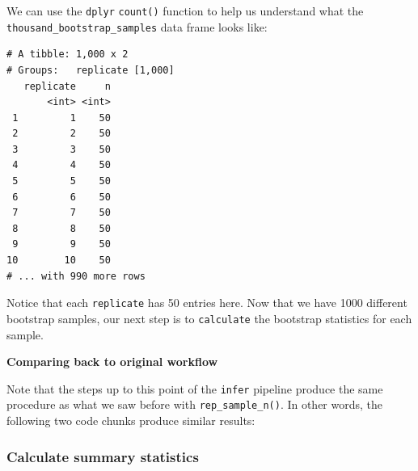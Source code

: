 \documentclass[12pt, krantz2,]{krantz}
\makeatletter
\newenvironment{Shaded}{\begin{snugshade}}{\end{snugshade}}
\newcommand{\CommentTok}[1]{\textcolor[rgb]{0.37,0.37,0.37}{\textit{#1}}}
\newcommand{\DataTypeTok}[1]{\textcolor[rgb]{0.27,0.27,0.27}{#1}}
\newcommand{\DecValTok}[1]{\textcolor[rgb]{0.06,0.06,0.06}{#1}}
\newcommand{\KeywordTok}[1]{\textcolor[rgb]{0.27,0.27,0.27}{\textbf{#1}}}
\newcommand{\NormalTok}[1]{#1}
\newcommand{\OperatorTok}[1]{\textcolor[rgb]{0.43,0.43,0.43}{\textbf{#1}}}
\newcommand{\OtherTok}[1]{\textcolor[rgb]{0.37,0.37,0.37}{#1}}
\newcommand{\StringTok}[1]{\textcolor[rgb]{0.5,0.5,0.5}{#1}}
\newenvironment{kframe}{%
\medskip{}
\setlength{\fboxsep}{.8em}
 \def\at@end@of@kframe{}%
 \ifinner\ifhmode%
  \def\at@end@of@kframe{\end{minipage}}%
  \begin{minipage}{\columnwidth}%
 \fi\fi%
 \def\FrameCommand##1{\hskip\@totalleftmargin \hskip-\fboxsep
 \colorbox{shadecolor}{##1}\hskip-\fboxsep
     \hskip-\linewidth \hskip-\@totalleftmargin \hskip\columnwidth}%
 \MakeFramed {\advance\hsize-\width
   \@totalleftmargin\z@ \linewidth\hsize
   \@setminipage}}%
 {\par\unskip\endMakeFramed%
 \at@end@of@kframe}
\renewenvironment{Shaded}{\begin{kframe}}{\end{kframe}}
\makeatother
\begin{document}
We can use the \texttt{dplyr} \texttt{count()} function to help us understand what the \texttt{thousand\_bootstrap\_samples} data frame looks like:

\begin{Shaded}
\end{Shaded}

\begin{verbatim}
# A tibble: 1,000 x 2
# Groups:   replicate [1,000]
   replicate     n
       <int> <int>
 1         1    50
 2         2    50
 3         3    50
 4         4    50
 5         5    50
 6         6    50
 7         7    50
 8         8    50
 9         9    50
10        10    50
# ... with 990 more rows
\end{verbatim}

Notice that each \texttt{replicate} has 50 entries here. Now that we have 1000 different bootstrap samples, our next step is to \texttt{calculate} the bootstrap statistics for each sample.

\textbf{Comparing back to original workflow}

Note that the steps up to this point of the \texttt{infer} pipeline produce the same procedure as what we saw before with \texttt{rep\_sample\_n()}. In other words, the following two code chunks produce similar results:

\begin{Shaded}
\end{Shaded}

\hypertarget{calculate-summary-statistics}{%
\subsubsection*{Calculate summary statistics}\label{calculate-summary-statistics}}
\end{document}
